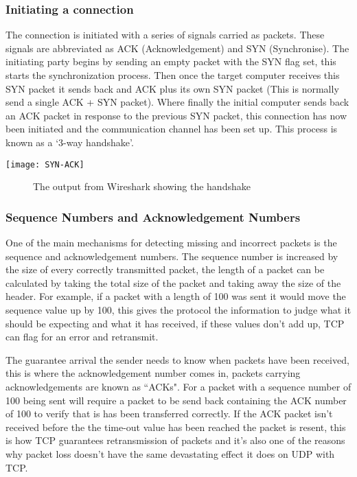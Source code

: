 \subsubsection*{Initiating a connection}
The connection is initiated with a series of signals carried as packets. These signals are abbreviated as ACK (Acknowledgement) and SYN (Synchronise). The initiating party begins by sending an empty packet with the SYN flag set, this starts the synchronization process. Then once the target computer receives this SYN packet it sends back and ACK plus its own SYN packet (This is normally send a single ACK + SYN packet). Where finally the initial computer sends back an ACK packet in response to the previous SYN packet, this connection has now been initiated and the communication channel has been set up. This process is known as a `3-way handshake'.

\begin{center}
	\texttt{[image: SYN-ACK]}
	\begin{figure}[h]
		\caption{The output from Wireshark showing the handshake}
	\end{figure}
\end{center}


\subsubsection*{Sequence Numbers and Acknowledgement Numbers}
One of the main mechanisms for detecting missing and incorrect packets is the sequence and acknowledgement numbers. The sequence number is increased by the size of every correctly transmitted packet, the length of a packet can be calculated by taking the total size of the packet and taking away the size of the header. For example, if a packet with a length of 100 was sent it would move the sequence value up by 100, this gives the protocol the information to judge what it should be expecting and what it has received, if these values don't add up, TCP can flag for an error and retransmit.

The guarantee arrival the sender needs to know when packets have been received, this is where the acknowledgement number comes in, packets carrying acknowledgements are known as ``ACKs". For a packet with a sequence number of 100 being sent will require a packet to be send back containing the ACK number of 100 to verify that is has been transferred correctly. If the ACK packet isn't received before the the time-out value has been reached the packet is resent, this is how TCP guarantees retransmission of packets and it's also one of the reasons why packet loss doesn't have the same devastating effect it does on UDP with TCP.

